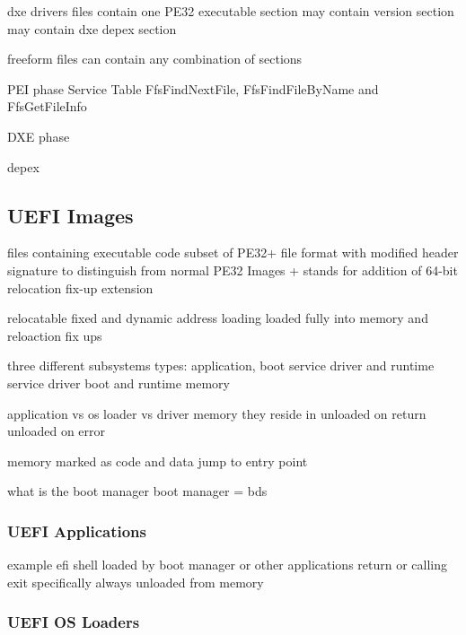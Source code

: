 dxe drivers files
contain one PE32 executable section
may contain version section
may contain dxe depex section

freeform files
can contain any combination of sections

PEI phase Service Table
FfsFindNextFile, FfsFindFileByName and FfsGetFileInfo

DXE phase

depex

\cite{tianocore-edk2-build-spec}

\subsection{\acs{UEFI} Images}


files containing executable code
subset of PE32+ file format with modified header signature to distinguish from normal PE32 Images
+ stands for addition of 64-bit relocation fix-up extension

relocatable
fixed and dynamic address loading
loaded fully into memory and reloaction fix ups

three different subsystems types: application, boot service driver and runtime service driver
boot and runtime memory

application vs os loader vs driver
memory they reside in
unloaded on return
unloaded on error

memory marked as code and data
jump to entry point

what is the boot manager
boot manager = bds

\subsubsection{\acs{UEFI} Applications}


example efi shell
loaded by boot manager or other applications
return or calling exit specifically
always unloaded from memory

\subsubsection{UEFI OS Loaders}


